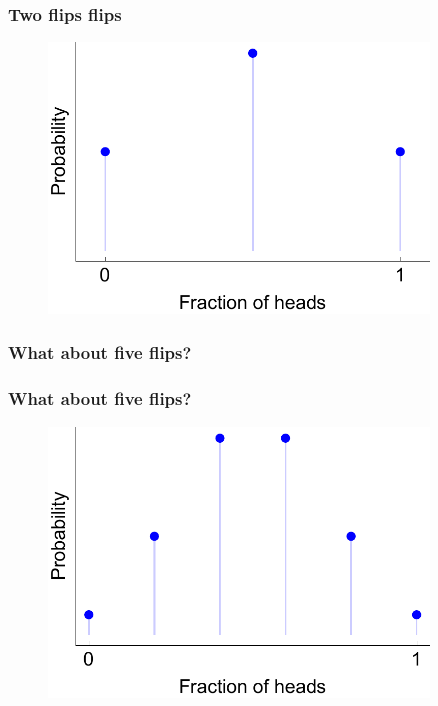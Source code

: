 \documentclass[handout]{beamer}
\begin{document}
\begin{frame}
	\frametitle{Two flips flips}
	
	\begin{figure}[ht]
		\centerline{\includegraphics[width=0.9\textwidth]{../figures/binomial_2.pdf}}
	\end{figure}
	
\end{frame}

\begin{frame}
	\frametitle{What about five flips?}
	
	
\end{frame}

\begin{frame}
	\frametitle{What about five flips?}
	
	\begin{figure}[ht]
		\centerline{\includegraphics[width=0.9\textwidth]{../figures/binomial_5.pdf}}
	\end{figure}
	
\end{frame}
\end{document}
